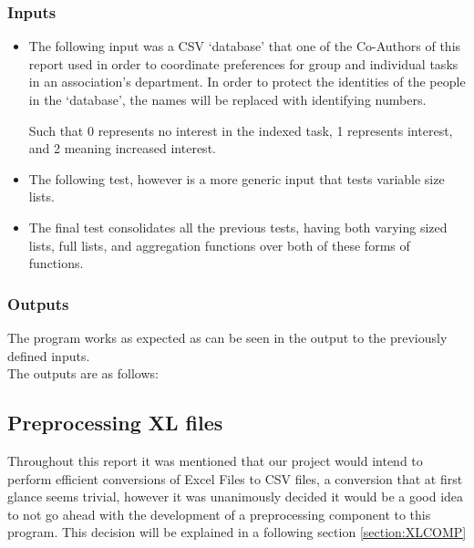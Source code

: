 \documentclass[11pt,a4paper,times]{report}
\begin{document}
\subsubsection*{Inputs}
\begin{itemize}
    \item The following input was a CSV `database' that one of the Co-Authors
        of this report used in order to coordinate preferences for group and individual tasks
        in an association's department. In order to protect the identities of the
        people in the `database', the names will be replaced with identifying
        numbers.
    
    Such that 0 represents no interest in the indexed task, 1 represents
    interest, and 2 meaning increased interest.
\item The following test, however is a more generic input that tests 
    variable size lists.
    
\item The final test consolidates all the previous tests, having both
    varying sized lists, full lists, and aggregation functions over
    both of these forms of functions.
    
\end{itemize}
\subsubsection*{Outputs}
The program works as expected as can be seen in the output to the
previously defined inputs. \\ The outputs are as follows:



\subsection{Preprocessing XL files}
Throughout this report it was mentioned that our project would intend to 
perform efficient conversions of Excel Files to CSV files, a conversion that
at first glance seems trivial, however it was unanimously decided it would be a
good idea to not go ahead with the development of a preprocessing component to this
program. This decision will be explained in a following section \ref{section:XLCOMP}
\end{document}
